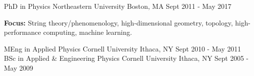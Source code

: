 

\begin{cventries}

  \cventry
    {PhD in Physics} %
    {Northeastern University} %
    {Boston, MA} %
    {Sept 2011 - May 2017} %
    {
      \begin{cvitems} %
        \item {\textbf{Focus:} String theory/phenomenology, high-dimensional geometry, topology, high-performance computing, machine learning.}
      \end{cvitems}
    }

  \cventry
    {MEng in Applied Physics} %
    {Cornell University} %
    {Ithaca, NY} %
    {Sept 2010 - May 2011} %
    {
    }
  \cventry
    {BSc in Applied \& Engineering Physics} %
    {Cornell University} %
    {Ithaca, NY} %
    {Sept 2005 - May 2009} %
    {
    }
\end{cventries}
